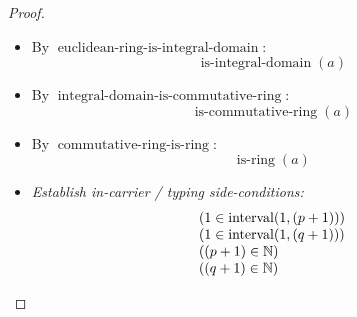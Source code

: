 \documentclass[11pt]{article}
\theoremstyle{plain}
\begin{document}
\begin{proof}
\begin{itemize}[leftmargin=2.8em, itemsep=4pt, parsep=1pt]
  \item[\textbf{8}] By $\operatorname{euclidean\text{-}ring\text{-}is\text{-}integral\text{-}domain}$:
\begin{equation*}
\operatorname{is\text{-}integral\text{-}domain}(a)
\end{equation*}

  \item[\textbf{9}] By $\operatorname{integral\text{-}domain\text{-}is\text{-}commutative\text{-}ring}$:
\begin{equation*}
\operatorname{is\text{-}commutative\text{-}ring}(a)
\end{equation*}

  \item[\textbf{10}] By $\operatorname{commutative\text{-}ring\text{-}is\text{-}ring}$:
\begin{equation*}
\operatorname{is\text{-}ring}(a)
\end{equation*}

  \item[\textbf{11--14}] \emph{Establish in-carrier / typing side-conditions:}
\begin{equation*}
\begin{array}{@{}l@{}}
(1 \in \operatorname{interval}(1, (p + 1))) \\
(1 \in \operatorname{interval}(1, (q + 1))) \\
((p + 1) \in \mathbb{N}) \\
((q + 1) \in \mathbb{N})
\end{array}
\end{equation*}


\end{itemize}
\end{proof}
\end{document}
